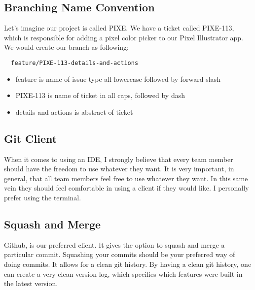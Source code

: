 \subsection { Branching Name Convention }
Let's imagine our project is called PIXE. We have a ticket called PIXE-113,
which is responsible for adding a pixel color picker to our Pixel Illustrator
app. We would create our branch as following:

\begin{verbatim}
  feature/PIXE-113-details-and-actions
\end{verbatim}

\begin{itemize}
  \item feature is name of issue type all lowercase followed by forward slash
  \item PIXE-113 is name of ticket in all caps, followed by dash
  \item details-and-actions is abstract of ticket
\end{itemize} 

\subsection { Git Client }
When it comes to using an IDE, I strongly believe that every team member should
have the freedom to use whatever they want. It is very important, in general,
that all team members feel free to use whatever they want. In this same vein
they should feel comfortable in using a client if they would like. I personally
prefer using the terminal.

\subsection { Squash and Merge }
Github, is our preferred client. It gives the option to squash and merge a
particular commit. Squashing your commits should be your preferred way of doing
commits. It allows for a clean git history. By having a clean git history, one
can create a very clean version log, which specifies which features were built
in the latest version.
